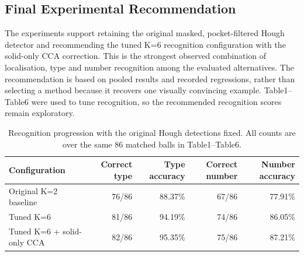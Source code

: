 \subsection{Final Experimental Recommendation}
\label{sec:final-configuration}

The experiments support retaining the original masked, pocket-filtered Hough
detector and recommending the tuned K=6 recognition configuration with the
solid-only CCA correction. This is the strongest observed combination of
localisation, type and number recognition among the evaluated alternatives.
The recommendation is based on pooled results and recorded regressions,
rather than selecting a method because it recovers one visually convincing
example. Table1--Table6 were used to tune recognition, so the recommended
recognition scores remain exploratory.

\begin{table}[htbp]
\centering
\small
\caption{Recognition progression with the original Hough detections fixed.
All counts are over the same 86 matched balls in Table1--Table6.}
\label{tab:final-recognition-progression}
\begin{tabular}{lrrrr}
\toprule
Configuration & Correct type & Type accuracy & Correct number & Number accuracy \\
\midrule
Original K=2 baseline & 76/86 & 88.37\% & 67/86 & 77.91\% \\
Tuned K=6 & 81/86 & 94.19\% & 74/86 & 86.05\% \\
Tuned K=6 + solid-only CCA & 82/86 & 95.35\% & 75/86 & 87.21\% \\
\bottomrule
\end{tabular}
\end{table}
\FloatBarrier

